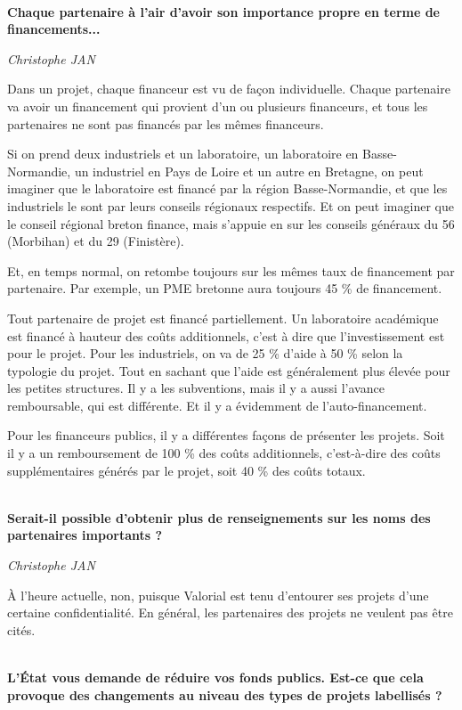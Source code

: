 \documentclass[a4paper,12pt]{report}
\begin{document}
	\textbf{\\Chaque partenaire à l’air d’avoir son importance propre en terme de financements...}

	\emph{Christophe JAN}
	
    Dans un projet, chaque financeur est vu de façon individuelle. Chaque partenaire va avoir un financement qui provient d’un ou plusieurs financeurs, et tous les partenaires ne sont pas financés par les mêmes financeurs. 

	Si on prend deux industriels et un laboratoire, un laboratoire en Basse-Normandie, un industriel en Pays de Loire et un autre en Bretagne, on peut imaginer que le laboratoire est financé par la région Basse-Normandie, et que les industriels le sont par leurs conseils régionaux respectifs. Et on peut imaginer que le conseil régional breton finance, mais s’appuie en sur les conseils généraux du 56 (Morbihan) et du 29 (Finistère).
	
	Et, en temps normal, on retombe toujours sur les mêmes taux de financement par partenaire. Par exemple, un PME bretonne aura toujours 45 \% de financement.

	Tout partenaire de projet est financé partiellement. Un laboratoire académique est financé à hauteur des coûts additionnels, c’est à dire que l’investissement est pour le projet. Pour les industriels, on va de 25 \% d’aide à 50 \% selon la typologie du projet. Tout en sachant que l’aide est généralement plus élevée pour les petites structures. Il y a les subventions, mais il y a aussi l’avance remboursable, qui est différente. Et il y a évidemment de l’auto-financement.
  
    Pour les financeurs publics, il y a différentes façons de présenter les projets. Soit il y a un remboursement de 100 \% des coûts additionnels, c’est-à-dire des coûts supplémentaires générés par le projet, soit 40 \% des coûts totaux.

	\textbf{\\Serait-il possible d’obtenir plus de renseignements sur les noms des partenaires importants ?}
	
	\emph{Christophe JAN}
	
    À l’heure actuelle, non, puisque Valorial est tenu d’entourer ses projets d’une certaine confidentialité. En général, les partenaires des projets ne veulent pas être cités.

	\textbf{\\L’État vous demande de réduire vos fonds publics. Est-ce que cela provoque des changements au niveau des types de projets labellisés ?}
\end{document}
